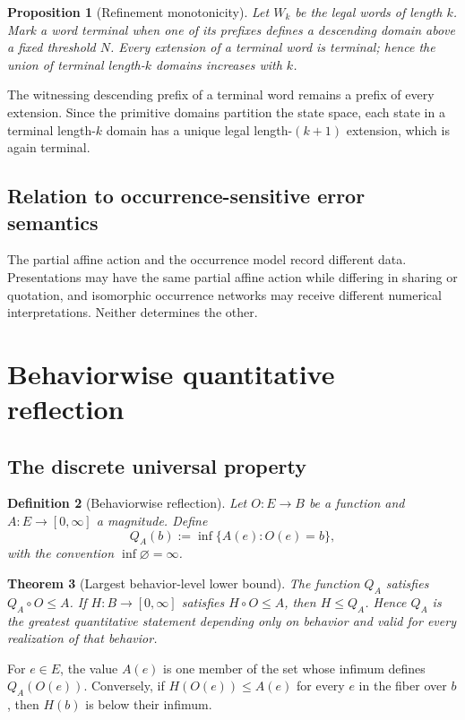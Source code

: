 \documentclass[12pt,a4paper,twoside]{extarticle}
\makeatletter
\theoremstyle{compactplain}
\newtheorem{theorem}{Theorem}[section]
\newtheorem{proposition}[theorem]{Proposition}
\theoremstyle{compactdef}
\newtheorem{definition}[theorem]{Definition}
\renewenvironment{proof}[1][\proofname]{\par\pushQED{\qed}\normalfont
  \topsep2pt\trivlist\item[\hskip\labelsep\bfseries #1\@addpunct{.}]\ignorespaces}
 {\popQED\endtrivlist\@endpefalse}
\makeatother
\begin{document}
\begin{proposition}[Refinement monotonicity]
Let $W_k$ be the legal words of length $k$. Mark a word terminal when one of its prefixes defines a descending domain above a fixed threshold $N$. Every extension of a terminal word is terminal; hence the union of terminal length-$k$ domains increases with $k$.
\end{proposition}
\begin{proof}
The witnessing descending prefix of a terminal word remains a prefix of every extension.  Since the primitive domains partition the state space, each state in a terminal length-$k$ domain has a unique legal length-$(k+1)$ extension, which is again terminal.
\end{proof}

\subsection{Relation to occurrence-sensitive error semantics}
The partial affine action and the occurrence model record different data. Presentations may have the same partial affine action while differing in sharing or quotation, and isomorphic occurrence networks may receive different numerical interpretations. Neither determines the other.

\section{Behaviorwise quantitative reflection}\label{sec:quant-reflection}

\subsection{The discrete universal property}
\begin{definition}[Behaviorwise reflection]
Let $O:E\to B$ be a function and $A:E\to[0,\infty]$ a magnitude.  Define
\[
  Q_A(b):=\inf\{A(e):O(e)=b\},
\]
with the convention $\inf\varnothing=\infty$.
\end{definition}

\begin{theorem}[Largest behavior-level lower bound]\label{thm:behavior-reflection}
The function $Q_A$ satisfies $Q_A\circ O\le A$.  If $H:B\to[0,\infty]$ satisfies $H\circ O\le A$, then $H\le Q_A$.  Hence $Q_A$ is the greatest quantitative statement depending only on behavior and valid for every realization of that behavior.
\end{theorem}
\begin{proof}
For $e\in E$, the value $A(e)$ is one member of the set whose infimum defines $Q_A(O(e))$.  Conversely, if $H(O(e))\le A(e)$ for every $e$ in the fiber over $b$, then $H(b)$ is below their infimum.
\end{proof}
\end{document}
